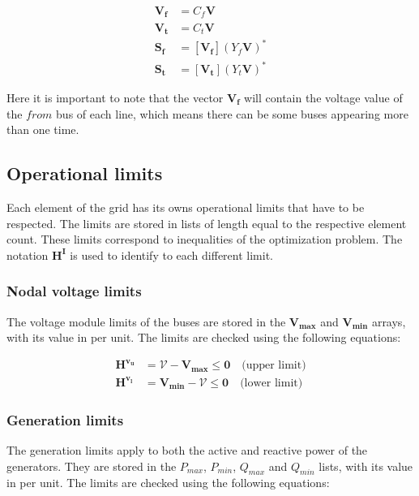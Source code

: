 \begin{equation}
    \begin{split}
    \bm{V_f} &= C_f \bm{V} \\
    \bm{V_t} &= C_t \bm{V} \\
    \bm{S_f} &= [\bm{V_f}] (Y_f \bm{V})^*\\
    \bm{S_t} &= [\bm{V_t}] (Y_t \bm{V})^*
    \end{split}
\end{equation}

Here it is important to note that the vector $\bm{V_f}$ will contain the voltage value of the $from$ bus of each line, which means there can be some buses appearing more than one time.

\subsection{Operational limits}

Each element of the grid has its owns operational limits that have to be respected. The limits are stored in lists of length equal to the respective element count.
These limits correspond to inequalities of the optimization problem. The notation $\bm{H^{I}}$ is used to identify to each different limit.

\subsubsection{Nodal voltage limits}

The voltage module limits of the buses are stored in the $\bm{V_{max}}$ and $\bm{V_{min}}$ arrays, with its value in per unit. The limits are checked using the following equations:

\begin{equation}
    \begin{split}
    \bm{H^{v_{u}}} &= \bm{\mathcal{V}} - \bm{V_{max}} \leq \bm{0} \quad \text{(upper limit)}\\
    \bm{H^{v_{l}}} &= \bm{V_{min}} - \bm{\mathcal{V}} \leq \bm{0} \quad \text{(lower limit)}
    \end{split}
\end{equation}

\subsubsection{Generation limits}

The generation limits apply to both the active and reactive power of the generators. They are stored in the $P_{max}$, $P_{min}$, $Q_{max}$ and $Q_{min}$ lists,
with its value in per unit. The limits are checked using the following equations:


